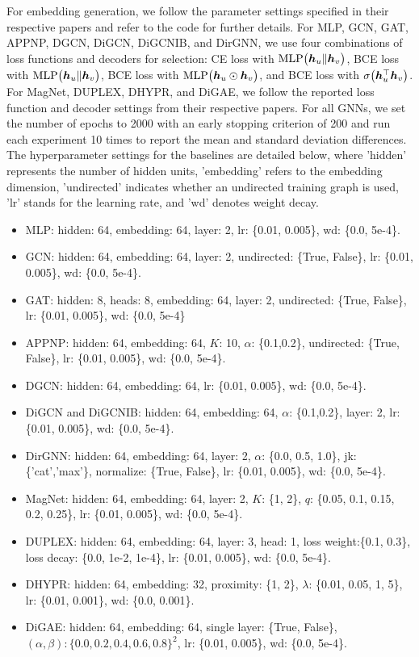 For embedding generation, we follow the parameter settings specified in their respective papers and refer to the code for further details.
For MLP, GCN, GAT, APPNP, DGCN, DiGCN, DiGCNIB, and DirGNN, we use four combinations of loss functions and decoders for selection: CE loss with \(\mathrm{MLP}\bigl({\bm{h}}_u\|{\bm{h}}_v \bigr)\), BCE loss with \(\mathrm{MLP}\bigl( {\bm{h}}_u\|{\bm{h}}_v\bigr)\), BCE loss with \(\mathrm{MLP}\bigl( {\bm{h}}_u \odot {\bm{h}}_v\bigr)\), and BCE loss with \(\sigma\bigl( {\bm{h}}_u^{\top}{\bm{h}}_v\bigr)\). For MagNet, DUPLEX, DHYPR, and DiGAE, we follow the reported loss function and decoder settings from their respective papers. For all GNNs, we set the number of epochs to 2000 with an early stopping criterion of 200 and run each experiment 10 times to report the mean and standard deviation differences.  
The hyperparameter settings for the baselines are detailed below, where 'hidden' represents the number of hidden units, 'embedding' refers to the embedding dimension, 'undirected' indicates whether an undirected training graph is used, 'lr' stands for the learning rate, and 'wd' denotes weight decay.
\begin{itemize}[topsep=0pt, partopsep=0pt]
    \item MLP: hidden: 64, embedding: 64, layer: 2, lr: \{0.01, 0.005\}, wd:  \{0.0, 5e-4\}.
    \item GCN: hidden: 64, embedding: 64, layer: 2, undirected: \{True, False\}, lr: \{0.01, 0.005\}, wd:  \{0.0, 5e-4\}.
    \item GAT: hidden: 8, heads: 8, embedding: 64, layer: 2,  undirected: \{True, False\}, lr: \{0.01, 0.005\}, wd:  \{0.0, 5e-4\}
    \item APPNP: hidden: 64, embedding: 64, $K$: 10, $\alpha$: \{0.1,0.2\}, undirected: \{True, False\}, lr: \{0.01, 0.005\}, wd:  \{0.0, 5e-4\}.
    \item DGCN: hidden: 64, embedding: 64, lr: \{0.01, 0.005\}, wd:  \{0.0, 5e-4\}.
    \item DiGCN and DiGCNIB: hidden: 64, embedding: 64, $\alpha$: \{0.1,0.2\}, layer: 2, lr: \{0.01, 0.005\}, wd:  \{0.0, 5e-4\}.
    \item DirGNN:  hidden: 64, embedding: 64, layer: 2, $\alpha$: \{0.0, 0.5, 1.0\},  jk: \{'cat','max'\}, normalize: \{True, False\}, lr: \{0.01, 0.005\}, wd:  \{0.0, 5e-4\}.
    \item MagNet: hidden: 64, embedding: 64, layer: 2, $K$: \{1, 2\}, $q$: \{0.05, 0.1, 0.15, 0.2, 0.25\}, lr: \{0.01, 0.005\}, wd:  \{0.0, 5e-4\}.
    \item DUPLEX: hidden: 64, embedding: 64, layer: 3, head: 1, loss weight:\{0.1, 0.3\}, loss decay: \{0.0, 1e-2, 1e-4\}, lr: \{0.01, 0.005\}, wd:  \{0.0, 5e-4\}.
    \item DHYPR: hidden: 64, embedding: 32, proximity: \{1, 2\}, $\lambda$: \{0.01, 0.05, 1, 5\}, lr: \{0.01, 0.001\}, wd:  \{0.0, 0.001\}.
    \item DiGAE: hidden: 64, embedding: 64, single layer: \{True, False\}, $(\alpha,\beta): \{0.0, 0.2, 0.4, 0.6, 0.8\}^2$, lr: \{0.01, 0.005\}, wd:  \{0.0, 5e-4\}.
\end{itemize}


